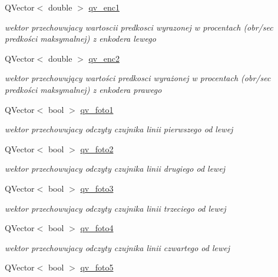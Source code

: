 \begin{DoxyCompactItemize}
\item 
Q\+Vector$<$ double $>$ \hyperlink{class_data_a7229f0da78654f3122d63a7b2bf993c8}{qv\+\_\+enc1}
\begin{DoxyCompactList}\small\item\em wektor przechowujacy wartoscii predkosci wyrazonej w procentach (obr/sec predkości maksymalnej) z enkodera lewego \end{DoxyCompactList}\item 
Q\+Vector$<$ double $>$ \hyperlink{class_data_ab2e63e74c9feb6090a6b7ac202c35535}{qv\+\_\+enc2}
\begin{DoxyCompactList}\small\item\em wektor przechowujący wartości predkosci wyrażonej w procentach (obr/sec predkości maksymalnej) z enkodera prawego \end{DoxyCompactList}\item 
Q\+Vector$<$ bool $>$ \hyperlink{class_data_af9e50ef903c8ee4a962493b3b0a2bf41}{qv\+\_\+foto1}
\begin{DoxyCompactList}\small\item\em wektor przechowujacy odczyty czujnika linii pierwszego od lewej \end{DoxyCompactList}\item 
Q\+Vector$<$ bool $>$ \hyperlink{class_data_aca198f3fc0cf108787779382ad6c91b8}{qv\+\_\+foto2}
\begin{DoxyCompactList}\small\item\em wektor przechowujacy odczyty czujnika linii drugiego od lewej \end{DoxyCompactList}\item 
Q\+Vector$<$ bool $>$ \hyperlink{class_data_a77d5041eb8b005cdd844231341431d26}{qv\+\_\+foto3}
\begin{DoxyCompactList}\small\item\em wektor przechowujacy odczyty czujnika linii trzeciego od lewej \end{DoxyCompactList}\item 
Q\+Vector$<$ bool $>$ \hyperlink{class_data_a75ed9bd7841452e381fc969add658c0f}{qv\+\_\+foto4}
\begin{DoxyCompactList}\small\item\em wektor przechowujacy odczyty czujnika linii czwartego od lewej \end{DoxyCompactList}\item 
Q\+Vector$<$ bool $>$ \hyperlink{class_data_a80728b543ea036049dffc151f7a08952}{qv\+\_\+foto5}

\end{DoxyCompactItemize}
